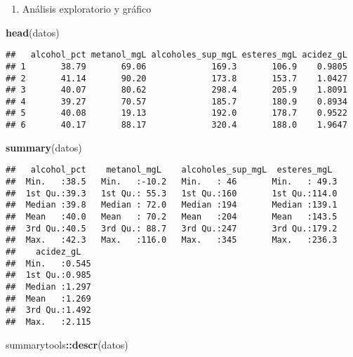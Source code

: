 \documentclass[
]{article}
\newenvironment{Shaded}{\begin{snugshade}}{\end{snugshade}}
\newcommand{\FunctionTok}[1]{\textcolor[rgb]{0.13,0.29,0.53}{\textbf{#1}}}
\newcommand{\NormalTok}[1]{#1}
\newcommand{\SpecialCharTok}[1]{\textcolor[rgb]{0.81,0.36,0.00}{\textbf{#1}}}
\providecommand{\tightlist}{%
  \setlength{\itemsep}{0pt}\setlength{\parskip}{0pt}}
\begin{document}
\begin{enumerate}
\def\labelenumi{\arabic{enumi})}
\setcounter{enumi}{1}
\tightlist
\item
  Análisis exploratorio y gráfico
\end{enumerate}

\begin{Shaded}
\begin{Highlighting}[]
\FunctionTok{head}\NormalTok{(datos)}
\end{Highlighting}
\end{Shaded}

\begin{verbatim}
##   alcohol_pct metanol_mgL alcoholes_sup_mgL esteres_mgL acidez_gL
## 1       38.79       69.06             169.3       106.9    0.9805
## 2       41.14       90.20             173.8       153.7    1.0427
## 3       40.07       80.62             298.4       205.9    1.8091
## 4       39.27       70.57             185.7       180.9    0.8934
## 5       40.08       19.13             192.0       178.7    0.9522
## 6       40.17       88.17             320.4       188.0    1.9647
\end{verbatim}

\begin{Shaded}
\begin{Highlighting}[]
\FunctionTok{summary}\NormalTok{(datos)}
\end{Highlighting}
\end{Shaded}

\begin{verbatim}
##   alcohol_pct    metanol_mgL    alcoholes_sup_mgL  esteres_mgL   
##  Min.   :38.5   Min.   :-10.2   Min.   : 46       Min.   : 49.3  
##  1st Qu.:39.3   1st Qu.: 55.3   1st Qu.:160       1st Qu.:114.0  
##  Median :39.8   Median : 72.0   Median :194       Median :139.1  
##  Mean   :40.0   Mean   : 70.2   Mean   :204       Mean   :143.5  
##  3rd Qu.:40.5   3rd Qu.: 88.7   3rd Qu.:247       3rd Qu.:179.2  
##  Max.   :42.3   Max.   :116.0   Max.   :345       Max.   :236.3  
##    acidez_gL    
##  Min.   :0.545  
##  1st Qu.:0.985  
##  Median :1.297  
##  Mean   :1.269  
##  3rd Qu.:1.492  
##  Max.   :2.115
\end{verbatim}

\begin{Shaded}
\begin{Highlighting}[]
\NormalTok{summarytools}\SpecialCharTok{::}\FunctionTok{descr}\NormalTok{(datos)}
\end{Highlighting}
\end{Shaded}
\end{document}
